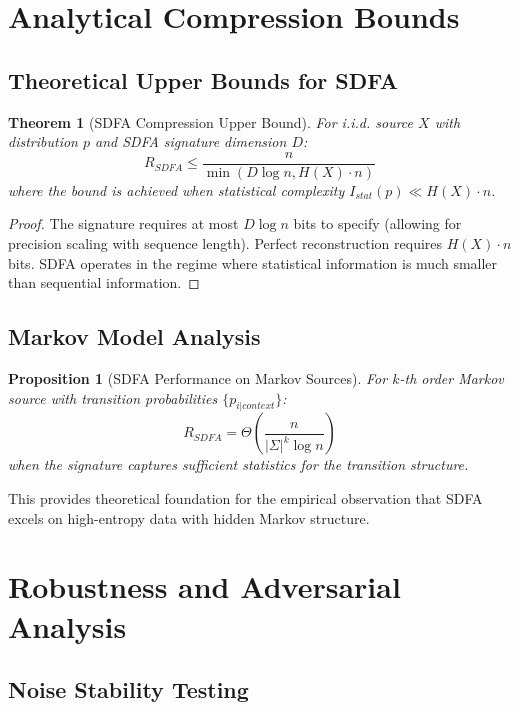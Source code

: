 \documentclass[11pt]{article}
\newtheorem{theorem}{Theorem}
\newtheorem{proposition}{Proposition}
\begin{document}
\section{Analytical Compression Bounds}

\subsection{Theoretical Upper Bounds for SDFA}

\begin{theorem}[SDFA Compression Upper Bound]
For i.i.d. source $X$ with distribution $p$ and SDFA signature dimension $D$:
\[R_{SDFA} \leq \frac{n}{\min(D \log n, H(X) \cdot n)}\]
where the bound is achieved when statistical complexity $I_{stat}(p) \ll H(X) \cdot n$.
\end{theorem}

\begin{proof}
The signature requires at most $D \log n$ bits to specify (allowing for precision scaling with sequence length). Perfect reconstruction requires $H(X) \cdot n$ bits. SDFA operates in the regime where statistical information is much smaller than sequential information.
\end{proof}

\subsection{Markov Model Analysis}

\begin{proposition}[SDFA Performance on Markov Sources]
For $k$-th order Markov source with transition probabilities $\{p_{i|context}\}$:
\[R_{SDFA} = \Theta\left(\frac{n}{|\Sigma|^k \log n}\right)\]
when the signature captures sufficient statistics for the transition structure.
\end{proposition}

This provides theoretical foundation for the empirical observation that SDFA excels on high-entropy data with hidden Markov structure.

\section{Robustness and Adversarial Analysis}

\subsection{Noise Stability Testing}
\end{document}
